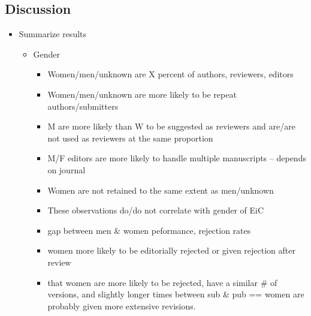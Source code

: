\documentclass[11pt,]{article}
\providecommand{\tightlist}{%
  \setlength{\itemsep}{0pt}\setlength{\parskip}{0pt}}
\begin{document}
\subsection{Discussion}\label{discussion}

\begin{itemize}
\tightlist
\item
  Summarize results

  \begin{itemize}
  \tightlist
  \item
    Gender

    \begin{itemize}
    \tightlist
    \item
      Women/men/unknown are X percent of authors, reviewers, editors
    \item
      Women/men/unknown are more likely to be repeat authors/submitters
    \item
      M are more likely than W to be suggested as reviewers and are/are
      not used as reviewers at the same proportion
    \item
      M/F editors are more likely to handle multiple manuscripts --
      depends on journal
    \item
      Women are not retained to the same extent as men/unknown
    \item
      These observations do/do not correlate with gender of EiC
    \item
      gap between men \& women peformance, rejection rates
    \item
      women more likely to be editorially rejected or given rejection
      after review
    \item
      that women are more likely to be rejected, have a similar \# of
      versions, and slightly longer times between sub \& pub == women
      are probably given more extensive revisions.
    \end{itemize}
  \end{itemize}
\end{itemize}
\end{document}
